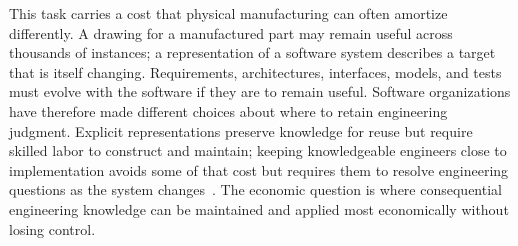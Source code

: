 
This task carries a cost that physical manufacturing can often amortize differently. A drawing for a manufactured part may remain useful across thousands of instances; a representation of a software system describes a target that is itself changing. Requirements, architectures, interfaces, models, and tests must evolve with the software if they are to remain useful. Software organizations have therefore made different choices about where to retain engineering judgment. Explicit representations preserve knowledge for reuse but require skilled labor to construct and maintain; keeping knowledgeable engineers close to implementation avoids some of that cost but requires them to resolve engineering questions as the system changes~\citep{kautz2018mbse}. The economic question is where consequential engineering knowledge can be maintained and applied most economically without losing control.


